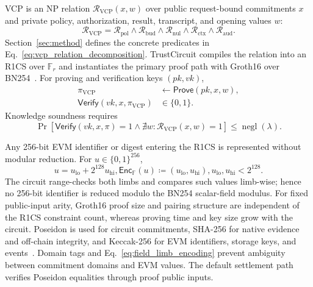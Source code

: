\documentclass[10pt,journal,compsoc]{IEEEtran}
\begin{document}
VCP is an NP relation $\mathcal{R}_{\mathrm{VCP}}(x,w)$ over public request-bound commitments $x$ and private policy, authorization, result, transcript, and opening values $w$:
\begin{equation}
\mathcal{R}_{\mathrm{VCP}}
=
\mathcal{R}_{\mathrm{pol}}
\land
\mathcal{R}_{\mathrm{bud}}
\land
\mathcal{R}_{\mathrm{nul}}
\land
\mathcal{R}_{\mathrm{ctx}}
\land
\mathcal{R}_{\mathrm{aud}}.
\label{eq:vcp_relation_decomposition}
\end{equation}
Section~\ref{sec:method} defines the concrete predicates in Eq.~\eqref{eq:vcp_relation_decomposition}. TrustCircuit compiles the relation into an R1CS over $\mathbb{F}_r$ and instantiates the primary proof path with Groth16 over BN254~\cite{groth2016size}. For proving and verification keys $(pk,vk)$,
\begin{equation}
\begin{aligned}
\pi_{\mathrm{VCP}} &\leftarrow \mathsf{Prove}(pk,x,w),\\
\mathsf{Verify}(vk,x,\pi_{\mathrm{VCP}})
&\in
\{0,1\}.
\end{aligned}
\label{eq:zk_proof_interface}
\end{equation}
Knowledge soundness requires
\begin{equation}
\Pr
\left[
\mathsf{Verify}(vk,x,\pi)=1
\land
\nexists w:
\mathcal{R}_{\mathrm{VCP}}(x,w)=1
\right]
\leq
\operatorname{negl}(\lambda).
\label{eq:zk_knowledge_soundness}
\end{equation}

Any 256-bit EVM identifier or digest entering the R1CS is represented without modular reduction. For $u\in\{0,1\}^{256}$,
\begin{equation}
u=u_{\mathrm{lo}}+2^{128}u_{\mathrm{hi}},
\mathsf{Enc}_{\mathbb{F}}(u)
\coloneqq
(u_{\mathrm{lo}},u_{\mathrm{hi}}),
u_{\mathrm{lo}},u_{\mathrm{hi}}<2^{128}.
\label{eq:field_limb_encoding}
\end{equation}
The circuit range-checks both limbs and compares such values limb-wise; hence no 256-bit identifier is reduced modulo the BN254 scalar-field modulus. For fixed public-input arity, Groth16 proof size and pairing structure are independent of the R1CS constraint count, whereas proving time and key size grow with the circuit. Poseidon is used for circuit commitments, SHA-256 for native evidence and off-chain integrity, and Keccak-256 for EVM identifiers, storage keys, and events~\cite{grassi2021poseidon}. Domain tags and Eq.~\eqref{eq:field_limb_encoding} prevent ambiguity between commitment domains and EVM values. The default settlement path verifies Poseidon equalities through proof public inputs.
\end{document}
